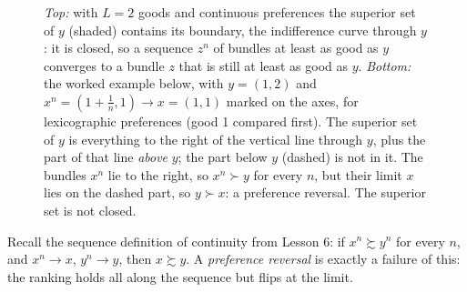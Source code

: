 \documentclass[11pt]{article}
\begin{document}
\begin{figure}[ht]
\caption{\emph{Top:} with $L=2$ goods and continuous preferences the superior set
of $y$ (shaded) contains its boundary, the indifference curve through $y$: it is
closed, so a sequence $z^{n}$ of bundles at least as good as $y$ converges to a
bundle $z$ that is still at least as good as $y$. \emph{Bottom:} the worked example
below, with $y=(1,2)$ and $x^{n}=(1+\frac1n,1)\to x=(1,1)$ marked on the axes, for
lexicographic preferences (good 1 compared first). The
superior set of $y$ is everything to the right of the vertical line through $y$,
plus the part of that line \emph{above} $y$; the part below $y$ (dashed) is not in
it. The bundles $x^{n}$ lie to the right, so $x^{n}\succ y$ for every $n$, but their
limit $x$ lies on the dashed part, so $y\succ x$: a preference reversal. The
superior set is not closed.}
\end{figure}

Recall the sequence definition of continuity from Lesson 6: if $x^{n}\succsim y^{n}$
for every $n$, and $x^{n}\to x$, $y^{n}\to y$, then $x\succsim y$. A \emph{preference
reversal} is exactly a failure of this: the ranking holds all along the sequence
but flips at the limit.
\end{document}
